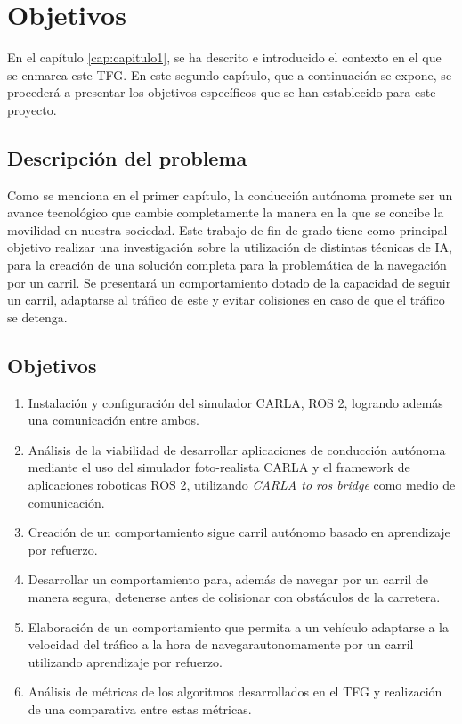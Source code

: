 \chapter{Objetivos}
\label{cap:capitulo2}

En el capítulo \ref{cap:capitulo1}, se ha descrito e introducido el contexto en el que se enmarca este \ac{TFG}. En este segundo capítulo, que a continuación se expone, se procederá a presentar los objetivos específicos que se han establecido para este proyecto.

\section{Descripción del problema}
\label{sec:descripcion_problema}

Como se menciona en el primer capítulo, la conducción autónoma promete ser un avance tecnológico que cambie completamente la manera en la que se concibe la movilidad en nuestra sociedad. Este trabajo de fin de grado tiene como principal objetivo realizar una investigación sobre la utilización de distintas técnicas de \ac{IA}, para la creación de una solución completa para la problemática de la navegación por un carril. Se presentará un comportamiento dotado de la capacidad de seguir un carril, adaptarse al tráfico de este y evitar colisiones en caso de que el tráfico se detenga.

\section{Objetivos}
\label{sec:Objetivos}

\begin{enumerate}
	\item Instalación y configuración del simulador CARLA, ROS 2, logrando además una comunicación entre ambos.
	\item Análisis de la viabilidad de desarrollar aplicaciones de conducción autónoma mediante el uso del simulador foto-realista CARLA y el framework de aplicaciones roboticas ROS 2, utilizando \textit{CARLA to ros bridge} como medio de comunicación.
	\item Creación de un comportamiento sigue carril autónomo basado en aprendizaje por refuerzo.
	\item Desarrollar un comportamiento para, además de navegar por un carril de manera segura, detenerse antes de colisionar con obstáculos de la carretera.
	\item Elaboración de un comportamiento que permita a un vehículo adaptarse a la velocidad del tráfico a la hora de navegarautonomamente  por un carril utilizando aprendizaje por refuerzo.
	\item Análisis de métricas de los algoritmos desarrollados en el \ac{TFG} y realización de una comparativa entre estas métricas.
\end{enumerate} 


